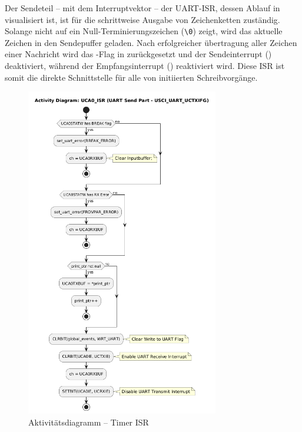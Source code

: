 Der Sendeteil -- mit dem Interruptvektor  -- der UART-ISR, dessen Ablauf in  visualisiert ist, ist f\"ur die schrittweise Ausgabe von Zeichenketten zust\"andig. Solange  nicht auf ein Null-Terminierungszeichen (\grq \texttt{\textbackslash 0}\grq) zeigt, wird das aktuelle Zeichen in den Sendepuffer  geladen. Nach erfolgreicher \"ubertragung aller Zeichen einer Nachricht wird das -Flag in  zur\"uckgesetzt und der Sendeinterrupt () deaktiviert, w\"ahrend der Empfangsinterrupt () reaktiviert wird. Diese ISR ist somit die direkte Schnittstelle f\"ur alle von  initiierten Schreibvorg\"ange.

\newpage
\begin{figure}[h!]
	\centering
	\includegraphics[width=0.75\textwidth]{../Bilder/observer_activity_diagram_eusci_send.png}
	\caption{Aktivit\"atsdiagramm -- Timer ISR}
	\label{fig:activity_diagram_uart_isr_send}
\end{figure}

